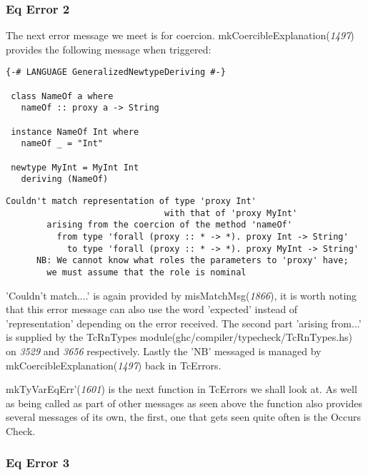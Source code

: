 \documentclass[a4paper]{article}
\begin{document}
\subsubsection{Eq Error 2}

The next error message we meet is for coercion. mkCoercibleExplanation(\textit{1497}) provides the following message when triggered: 

\begin{lstlisting}[label={lst: T8.0}, numbers=none, caption={Example Program \cite{ex8}}]
{-# LANGUAGE GeneralizedNewtypeDeriving #-}

 class NameOf a where
   nameOf :: proxy a -> String

 instance NameOf Int where
   nameOf _ = "Int"

 newtype MyInt = MyInt Int
   deriving (NameOf) 
\end{lstlisting}

\begin{lstlisting}[label={lst: T8.0.2}, numbers=none, caption={Error}]
Couldn't match representation of type 'proxy Int'
                               with that of 'proxy MyInt'
        arising from the coercion of the method 'nameOf'
          from type 'forall (proxy :: * -> *). proxy Int -> String'
            to type 'forall (proxy :: * -> *). proxy MyInt -> String'
      NB: We cannot know what roles the parameters to 'proxy' have;
        we must assume that the role is nominal
\end{lstlisting}

'Couldn't match....' is again provided by misMatchMsg(\textit{1866}), it is worth noting that this error message can also use the word 'expected' instead of 'representation' depending on the error received. The second part 'arising from...' is supplied by the TcRnTypes module(ghc/compiler/typecheck/TcRnTypes.hs) on \textit{3529} and \textit{3656} respectively. Lastly the 'NB' messaged is managed by mkCoercibleExplanation(\textit{1497}) back in TcErrors.

mkTyVarEqErr'(\textit{1601}) is the next function in TcErrors we shall look at. As well as being called as part of other messages as seen above the function also provides several messages of its own, the first, one that gets seen quite often is the Occurs Check.

\subsubsection{Eq Error 3}
\end{document}
